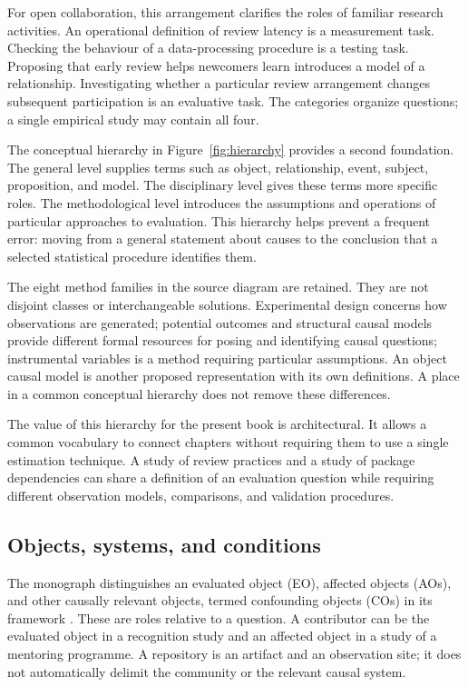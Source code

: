 

For open collaboration, this arrangement clarifies the roles of familiar research activities. An operational definition of review latency is a measurement task. Checking the behaviour of a data-processing procedure is a testing task. Proposing that early review helps newcomers learn introduces a model of a relationship. Investigating whether a particular review arrangement changes subsequent participation is an evaluative task. The categories organize questions; a single empirical study may contain all four.

The conceptual hierarchy in Figure~\ref{fig:hierarchy} provides a second foundation. The general level supplies terms such as object, relationship, event, subject, proposition, and model. The disciplinary level gives these terms more specific roles. The methodological level introduces the assumptions and operations of particular approaches to evaluation. This hierarchy helps prevent a frequent error: moving from a general statement about causes to the conclusion that a selected statistical procedure identifies them.



The eight method families in the source diagram are retained. They are not disjoint classes or interchangeable solutions. Experimental design concerns how observations are generated; potential outcomes and structural causal models provide different formal resources for posing and identifying causal questions; instrumental variables is a method requiring particular assumptions. An object causal model is another proposed representation with its own definitions. A place in a common conceptual hierarchy does not remove these differences.

The value of this hierarchy for the present book is architectural. It allows a common vocabulary to connect chapters without requiring them to use a single estimation technique. A study of review practices and a study of package dependencies can share a definition of an evaluation question while requiring different observation models, comparisons, and validation procedures.

\subsection{Objects, systems, and conditions}
The monograph distinguishes an evaluated object (EO), affected objects (AOs), and other causally relevant objects, termed confounding objects (COs) in its framework \citep[Chapters~8 and 10]{zhan2026book}. These are roles relative to a question. A contributor can be the evaluated object in a recognition study and an affected object in a study of a mentoring programme. A repository is an artifact and an observation site; it does not automatically delimit the community or the relevant causal system.

